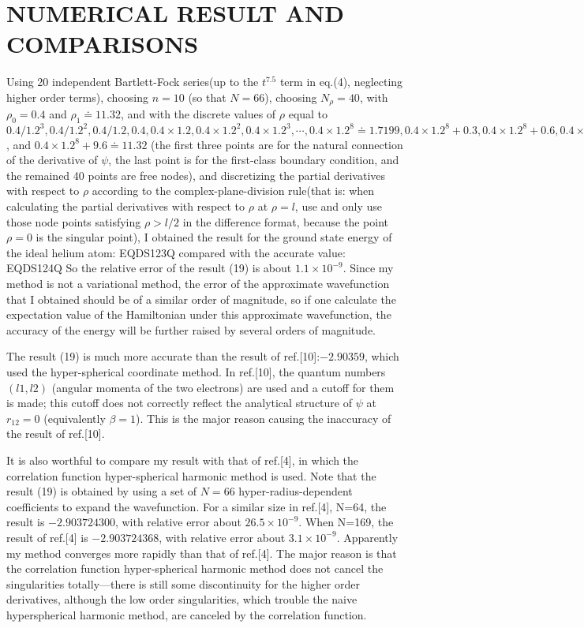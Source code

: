 \section{NUMERICAL RESULT AND COMPARISONS}

Using 20 independent Bartlett-Fock series(up to the $t^{7.5}$ term in eq.(4),
neglecting higher order terms),
choosing $n=10$ (so that $N=66$), choosing $N_{\rho}=40$, with
$\rho_{0}=0.4$ and $\rho_{1}\doteq 11.32$, and
with the discrete values of $\rho$
equal to $0.4/1.2^{3}, 0.4/1.2^{2}, 0.4/1.2, 0.4, 0.4\times 1.2,
0.4\times 1.2^{2}, 0.4\times 1.2^{3}, \cdots, 0.4\times 1.2^{8}\doteq 1.7199,
0.4\times 1.2^{8}+0.3, 0.4\times 1.2^{8}+0.6, 0.4\times 1.2^{8}+0.9,
\cdots, 0.4\times 1.2^{8}+9.3$, and
$0.4\times 1.2^{8}+9.6\doteq 11.32$ (the first three
points are for the natural connection of the derivative of $\psi$,
the last point is for the first-class
boundary condition, and the remained 40 points are free nodes),
and discretizing the partial derivatives with respect to $\rho$ according
to the complex-plane-division rule(that is: when calculating the partial
derivatives with respect to $\rho$ at $\rho=l$, use and only use
those node points satisfying $\rho>l/2$ in the difference format, because the
point $\rho=0$ is the singular point), I obtained the
result for the ground state
energy of the ideal helium atom:
 EQDS123Q 
compared with the accurate value:
 EQDS124Q 
So the relative error of the result (19) is about $1.1\times 10^{-9}$.
Since my method is not a variational method,
the error of the approximate wavefunction
that I obtained should be of a similar order of magnitude, so if one
calculate the expectation value of the Hamiltonian under this approximate
wavefunction, the accuracy of the energy will be further raised by
several orders of magnitude.

The result (19) is much more accurate than the result
of ref.[10]:$-2.90359$, which
used the hyper-spherical coordinate method.
In ref.[10], the quantum numbers $(l1,l2)$
(angular momenta of the two electrons) are used and a cutoff for them
is made; this cutoff does not correctly reflect the analytical
structure of $\psi$ at $r_{12}=0$ (equivalently $\beta=1$). This is the major
reason causing the inaccuracy of the result of ref.[10].

It is also worthful to compare my result with that of ref.[4], in which
the correlation function hyper-spherical harmonic method is used. Note that
the result (19) is obtained by using a set of $N=66$
hyper-radius-dependent coefficients to expand the wavefunction. For a similar
size in ref.[4], N=64, the result is $-2.903724300$, with relative error
about $26.5\times 10^{-9}$. When N=169, the result of ref.[4] is
$-2.903724368$, with relative error about $3.1\times 10^{-9}$. Apparently
my method converges more rapidly than that of ref.[4]. The major reason
is that the correlation function hyper-spherical harmonic method does not
cancel the singularities totally---there is still some discontinuity
for the higher order derivatives, although the low order singularities,
which trouble the naive hyperspherical harmonic method, are canceled by
the correlation function.

